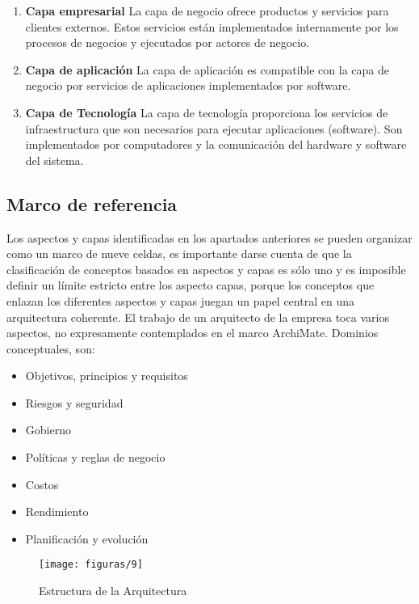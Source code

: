  \begin{enumerate}
  	\item \textbf{Capa empresarial} La capa de negocio ofrece productos y servicios para clientes externos. Estos servicios están implementados internamente por los procesos de negocios y ejecutados por actores de negocio.
  	\item \textbf{Capa de aplicación} La capa de aplicación es compatible con la capa de negocio por servicios de aplicaciones implementados por software.
  	\item \textbf{Capa de Tecnología} La capa de tecnología proporciona los servicios de infraestructura que son necesarios para ejecutar aplicaciones (software). Son implementados por computadores y la comunicación del hardware y software del sistema.
  \end{enumerate}
  
  \subsection{Marco de referencia}
Los aspectos y capas identificadas en los apartados anteriores se pueden organizar como un marco de nueve celdas, es importante darse cuenta de que la clasificación de conceptos basados en aspectos y capas es sólo uno y es imposible definir un límite estricto entre los aspecto capas, porque los conceptos que enlazan los diferentes aspectos y capas juegan un papel central en una arquitectura coherente. El trabajo de un arquitecto de la empresa toca varios aspectos, no expresamente contemplados en el marco ArchiMate. Dominios conceptuales, son:
  \begin{itemize}
  	\item Objetivos, principios y requisitos
  	\item Riesgos y seguridad
  	\item Gobierno
  	\item Políticas y reglas de negocio
  	\item Costos
  	\item Rendimiento
  	\item Planificación y evolución
  \end{itemize}
  
  \begin{figure}[H]
   	\centering
   	\texttt{[image: figuras/9]}
   	\captionsetup{width=.95\textwidth}
   	\caption{Estructura de la Arquitectura}
   	\label{figura9}
  \end{figure}

